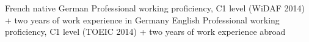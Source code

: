

\begin{cvskills}

  \cvskill
    {French} %
    {native} %
  \cvskill
	{German} %
	{Professional working proficiency, C1 level (WiDAF 2014) + two years of work experience in Germany} %
  \cvskill
	{English} %
	{Professional working proficiency, C1 level (TOEIC 2014) + two years of work experience abroad} %
\end{cvskills}
